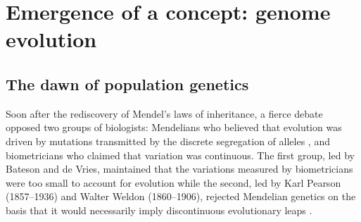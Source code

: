 

%


\section{Emergence of a concept: genome evolution}

\subsection{The dawn of population genetics}

Soon after the rediscovery of Mendel's laws of inheritance, a fierce debate opposed two groups of biologists: Mendelians who believed that evolution was driven by mutations transmitted by the discrete segregation of alleles \citep{bowler2003evolution}, and biometricians who claimed that variation was continuous.
The first group, led by Bateson and de Vries, maintained that the variations measured by biometricians were too small to account for evolution while the second, led by Karl Pearson (1857--1936) and Walter Weldon (1860--1906), rejected Mendelian genetics on the basis that it would necessarily imply discontinuous evolutionary leaps \citep{provine2001origins}.


